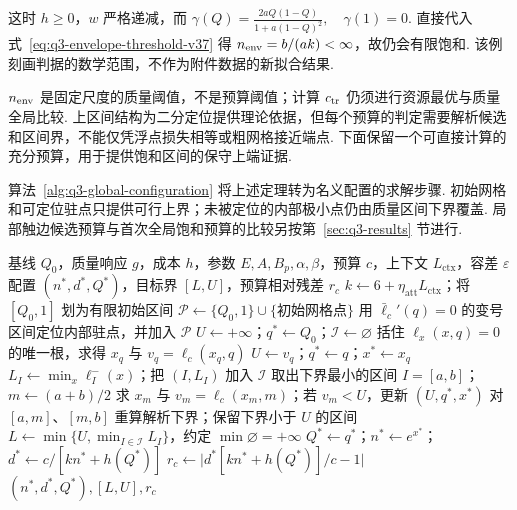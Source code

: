 这时 $h\ge0$，$w$ 严格递减，而
$\gamma(Q)=\frac{2aQ(1-Q)}{1+a(1-Q)^2},\quad\gamma(1)=0.$
直接代入式~\eqref{eq:q3-envelope-threshold-v37} 得 $n_{\rm env}=b/(ak)<\infty$，故仍会有限饱和. 该例刻画判据的数学范围，不作为附件数据的新拟合结果. 

$n_{\rm env}$ 是固定尺度的质量阈值，不是预算阈值；计算 $c_{\rm tr}$ 仍须进行资源最优与质量全局比较. 上区间结构为二分定位提供理论依据，但每个预算的判定需要解析候选和区间界，不能仅凭浮点损失相等或粗网格接近端点. 下面保留一个可直接计算的充分预算，用于提供饱和区间的保守上端证据. 

算法~\ref{alg:q3-global-configuration} 将上述定理转为名义配置的求解步骤. 初始网格和可定位驻点只提供可行上界；未被定位的内部极小点仍由质量区间下界覆盖. 局部触边候选预算与首次全局饱和预算的比较另按第~\ref{sec:q3-results} 节进行. 
\begin{algorithm}[H]
\caption{第三问的全局质量--资源配置求解}\label{alg:q3-global-configuration}
\small
\begin{algorithmic}[1]
\Require 基线 $Q_0$，质量响应 $g$，成本 $h$，参数 $E,A,B_p,\alpha,\beta$，预算 $c$，上下文 $L_{\mathrm{ctx}}$，容差 $\varepsilon$
\Ensure 配置 $(n^*,d^*,Q^*)$，目标界 $[L,U]$，预算相对残差 $r_c$
\State $k\gets6+\eta_{\mathrm{att}}L_{\mathrm{ctx}}$；将 $[Q_0,1]$ 划为有限初始区间
\State $\mathcal P\gets\{Q_0,1\}\cup\{\text{初始网格点}\}$
\State 用 $\bar\ell_c'(q)=0$ 的变号区间定位内部驻点，并加入 $\mathcal P$ 
\State $U\gets+\infty$；$q^*\gets Q_0$；$\mathcal I\gets\varnothing$
  \State 括住 $\ell_x(x,q)=0$ 的唯一根，求得 $x_q$ 与 $v_q=\ell_c(x_q,q)$ 
   \State $U\gets v_q$；$q^*\gets q$；$x^*\gets x_q$ \EndIf
\EndFor
{}
  \State $L_I\gets\min_x\ell^-_I(x)$；把 $(I,L_I)$ 加入 $\mathcal I$ 
\EndFor
{}
  \State 取出下界最小的区间 $I=[a,b]$；$m\gets(a+b)/2$
  \State 求 $x_m$ 与 $v_m=\ell_c(x_m,m)$；若 $v_m<U$，更新 $(U,q^*,x^*)$
  \State 对 $[a,m]$、$[m,b]$ 重算解析下界；保留下界小于 $U$ 的区间
\EndWhile
\State $L\gets\min\{U,\min_{I\in\mathcal I}L_I\}$，约定 $\min\varnothing=+\infty$
\State $Q^*\gets q^*$；$n^*\gets e^{x^*}$；$d^*\gets c/[kn^*+h(Q^*)]$
\State $r_c\gets\bigl|d^*[kn^*+h(Q^*)]/c-1\bigr|$ 
\State \Return $(n^*,d^*,Q^*),[L,U],r_c$
\end{algorithmic}
\end{algorithm}

